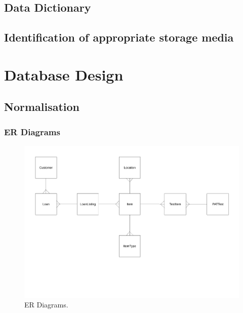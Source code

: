 \subsection{Data Dictionary}

\subsection{Identification of appropriate storage media}

\section{Database Design}

\subsection{Normalisation}

\newpage

\begin{landscape}

\subsubsection{ER Diagrams}

\begin{figure}[H]
    \centerline{\includegraphics[width=600px]{./Design/Database_Design/Normalisation/ER_Diagrams/ER_Diagram.pdf}}
    \caption{ER Diagrams.} \label{fig:ER Diagrams}
\end{figure}

\end{landscape}


